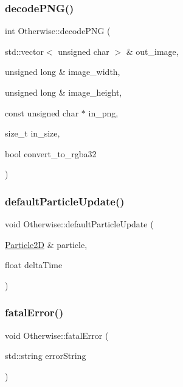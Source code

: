 \subsubsection{\texorpdfstring{decode\+P\+N\+G()}{decodePNG()}}
{\footnotesize\ttfamily int Otherwise\+::decode\+P\+NG (\begin{DoxyParamCaption}\item[{std\+::vector$<$ unsigned char $>$ \&}]{out\+\_\+image,  }\item[{unsigned long \&}]{image\+\_\+width,  }\item[{unsigned long \&}]{image\+\_\+height,  }\item[{const unsigned char $\ast$}]{in\+\_\+png,  }\item[{size\+\_\+t}]{in\+\_\+size,  }\item[{bool}]{convert\+\_\+to\+\_\+rgba32 }\end{DoxyParamCaption})}

\mbox{\label{namespace_otherwise_ac7cfb6f643b2ea32aa02502159d17fb6}} 
\subsubsection{\texorpdfstring{default\+Particle\+Update()}{defaultParticleUpdate()}}
{\footnotesize\ttfamily void Otherwise\+::default\+Particle\+Update (\begin{DoxyParamCaption}\item[{\hyperlink{class_otherwise_1_1_particle2_d}{Particle2D} \&}]{particle,  }\item[{float}]{delta\+Time }\end{DoxyParamCaption})\hspace{0.3cm}{\ttfamily [inline]}}

\mbox{\label{namespace_otherwise_a31f746eab61d4cf3a75ec998799d5710}} 
\subsubsection{\texorpdfstring{fatal\+Error()}{fatalError()}}
{\footnotesize\ttfamily void Otherwise\+::fatal\+Error (\begin{DoxyParamCaption}\item[{std\+::string}]{error\+String }\end{DoxyParamCaption})}

